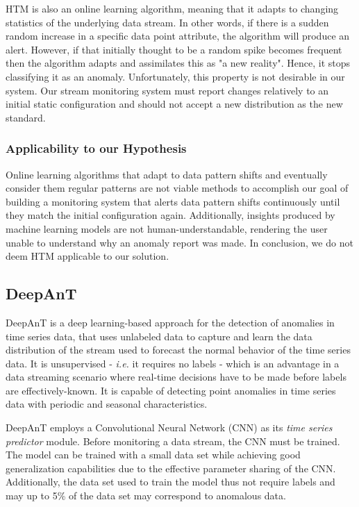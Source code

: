 HTM is also an online learning algorithm, meaning that it adapts to changing statistics of the underlying data stream. In other words, if there is a sudden random increase in a specific data point attribute, the algorithm will produce an alert. However, if that initially thought to be a random spike becomes frequent then the algorithm adapts and assimilates this as "a new reality". Hence, it stops classifying it as an anomaly. Unfortunately, this property is not desirable in our system. Our stream monitoring system must report changes relatively to an initial static configuration and should not accept a new distribution as the new standard.

\subsubsection{Applicability to our Hypothesis}
Online learning algorithms that adapt to data pattern shifts and eventually consider them regular patterns are not viable methods to accomplish our goal of building a monitoring system that alerts data pattern shifts continuously until they match the initial configuration again. Additionally, insights produced by machine learning models are not human-understandable, rendering the user unable to understand why an anomaly report was made. In conclusion, we do not deem HTM applicable to our solution.

\subsection{DeepAnT}

DeepAnT \cite{Munir-DeepAnT} is a deep learning-based approach for the detection of anomalies in time series data, that uses unlabeled data to capture and learn the data distribution of the stream used to forecast the normal behavior of the time series data. It is unsupervised - \textit{i.e.} it requires no labels - which is an advantage in a data streaming scenario where real-time decisions have to be made before labels are effectively-known. It is capable of detecting point anomalies in time series data with periodic and seasonal characteristics.

DeepAnT employs a Convolutional Neural Network (CNN) as its \textit{time series predictor} module. Before monitoring a data stream, the CNN must be trained. The model can be trained with a small data set while achieving good generalization capabilities due to the effective parameter sharing of the CNN. Additionally, the data set used to train the model thus not require labels and may up to 5\% of the data set may correspond to anomalous data.

